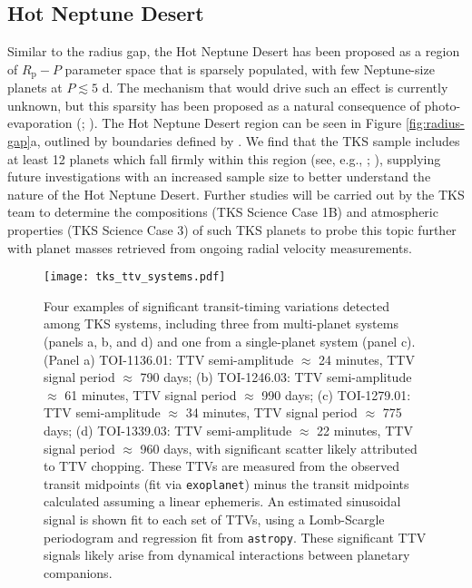 \documentclass[twocolumn]{aastex63}
\begin{document}
\subsection{Hot Neptune Desert}
\label{sec:neptunedesert}

Similar to the radius gap, the Hot Neptune Desert has been proposed as a region of $R_\textrm{p}-P$ parameter space that is sparsely populated, with few Neptune-size planets at $P \lesssim 5$ d. The mechanism that would drive such an effect is currently unknown, but this sparsity has been proposed as a natural consequence of photo-evaporation (\citealt{Lopez13}; \citealt{Owen13}). The Hot Neptune Desert region can be seen in Figure \ref{fig:radius-gap}a, outlined by boundaries defined by \cite{Mazeh16}. We find that the TKS sample includes at least 12 planets which fall firmly within this region (see, e.g., \citealt{MacDougall22}; \citealt{VanZandt22}), supplying future investigations with an increased sample size to better understand the nature of the Hot Neptune Desert. Further studies will be carried out by the TKS team to determine the compositions (TKS Science Case 1B) and atmospheric properties (TKS Science Case 3) of such TKS planets to probe this topic further with planet masses retrieved from ongoing radial velocity measurements.

\begin{figure}[ht]
\centering
\texttt{[image: tks\_ttv\_systems.pdf]}
\caption{Four examples of significant transit-timing variations detected among TKS systems, including three from multi-planet systems (panels a, b, and d) and one from a single-planet system (panel c). (Panel a) TOI-1136.01: TTV semi-amplitude $\approx$ 24 minutes, TTV signal period $\approx$ 790 days; (b) TOI-1246.03: TTV semi-amplitude $\approx$ 61 minutes, TTV signal period $\approx$ 990 days; (c) TOI-1279.01: TTV semi-amplitude $\approx$ 34 minutes, TTV signal period $\approx$ 775 days; (d) TOI-1339.03: TTV semi-amplitude $\approx$ 22 minutes, TTV signal period $\approx$ 960 days, with significant scatter likely attributed to TTV chopping. These TTVs are measured from the observed transit midpoints (fit via \texttt{exoplanet}) minus the transit midpoints calculated assuming a linear ephemeris. An estimated sinusoidal signal is shown fit to each set of TTVs, using a Lomb-Scargle periodogram and regression fit from \texttt{astropy}. These significant TTV signals likely arise from dynamical interactions between planetary companions.} 
\label{fig:ttvs}
\end{figure}
\end{document}
